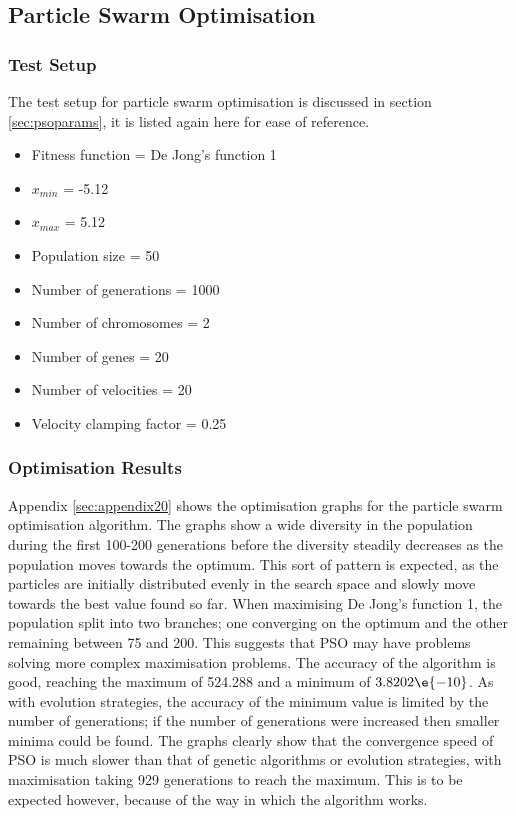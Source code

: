 \subsection{Particle Swarm Optimisation}

\subsubsection{Test Setup}
The test setup for particle swarm optimisation is discussed in section \ref{sec:psoparams}, it is listed again here for ease of reference.
\begin{itemize}
  \item{Fitness function = De Jong's function 1}
  \item{$x_{min}$ = -5.12}
  \item{$x_{max}$ = 5.12}
  \item{Population size = 50}
  \item{Number of generations = 1000}
  \item{Number of chromosomes = 2}
  \item{Number of genes = 20}
  \item{Number of velocities = 20}
  \item{Velocity clamping factor = 0.25}
\end{itemize}

\subsubsection{Optimisation Results}
Appendix \ref{sec:appendix20} shows the optimisation graphs for the particle swarm optimisation algorithm. The graphs show a wide diversity in the population during the first 100-200 generations before the diversity steadily decreases as the population moves towards the optimum. This sort of pattern is expected, as the particles are initially distributed evenly in the search space and slowly move towards the best value found so far. When maximising De Jong's function 1, the population split into two branches; one converging on the optimum and the other remaining between 75 and 200. This suggests that PSO may have problems solving more complex maximisation problems. The accuracy of the algorithm is good, reaching the maximum of 524.288 and a minimum of $3.8202\e{-10}$. As with evolution strategies, the accuracy of the minimum value is limited by the number of generations; if the number of generations were increased then smaller minima could be found. The graphs clearly show that the convergence speed of PSO is much slower than that of genetic algorithms or evolution strategies, with maximisation taking 929 generations to reach the maximum. This is to be expected however, because of the way in which the algorithm works.

